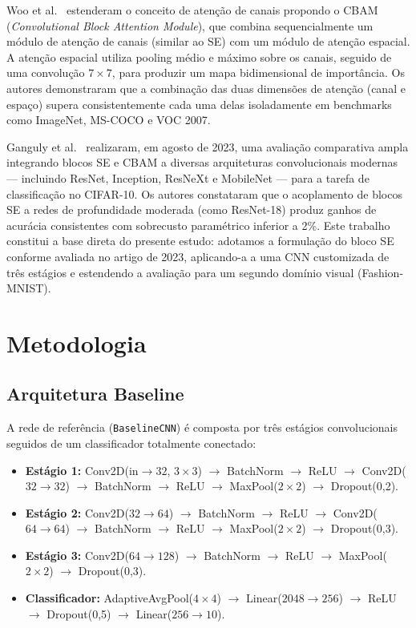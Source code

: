 \documentclass[runningheads]{llncs}
\begin{document}
Woo et al.~\cite{ref_cbam} estenderam o conceito de atenção de canais
propondo o CBAM (\textit{Convolutional Block Attention Module}), que
combina sequencialmente um módulo de atenção de canais (similar ao SE)
com um módulo de atenção espacial. A atenção espacial utiliza pooling
médio e máximo sobre os canais, seguido de uma convolução $7 \times 7$,
para produzir um mapa bidimensional de importância. Os autores
demonstraram que a combinação das duas dimensões de atenção (canal e
espaço) supera consistentemente cada uma delas isoladamente em
benchmarks como ImageNet, MS-COCO e VOC 2007.

Ganguly et al.~\cite{ref_ganguly2023} realizaram, em agosto de 2023, uma
avaliação comparativa ampla integrando blocos SE e CBAM a diversas
arquiteturas convolucionais modernas --- incluindo ResNet, Inception,
ResNeXt e MobileNet --- para a tarefa de classificação no CIFAR-10. Os
autores constataram que o acoplamento de blocos SE a redes de
profundidade moderada (como ResNet-18) produz ganhos de acurácia
consistentes com sobrecusto paramétrico inferior a 2\%. Este trabalho
constitui a base direta do presente estudo: adotamos a formulação do
bloco SE conforme avaliada no artigo de 2023, aplicando-a a uma CNN
customizada de três estágios e estendendo a avaliação para um segundo
domínio visual (Fashion-MNIST).

\section{Metodologia}

\subsection{Arquitetura Baseline}

A rede de referência (\texttt{BaselineCNN}) é composta por três estágios
convolucionais seguidos de um classificador totalmente conectado:

\begin{itemize}
  \item \textbf{Estágio 1:} Conv2D($\text{in} \to 32$, $3 \times 3$)
    $\to$ BatchNorm $\to$ ReLU $\to$ Conv2D($32 \to 32$) $\to$
    BatchNorm $\to$ ReLU $\to$ MaxPool($2 \times 2$) $\to$ Dropout(0,2).
  \item \textbf{Estágio 2:} Conv2D($32 \to 64$) $\to$ BatchNorm $\to$
    ReLU $\to$ Conv2D($64 \to 64$) $\to$ BatchNorm $\to$ ReLU $\to$
    MaxPool($2 \times 2$) $\to$ Dropout(0,3).
  \item \textbf{Estágio 3:} Conv2D($64 \to 128$) $\to$ BatchNorm $\to$
    ReLU $\to$ MaxPool($2 \times 2$) $\to$ Dropout(0,3).
  \item \textbf{Classificador:} AdaptiveAvgPool($4 \times 4$) $\to$
    Linear($2048 \to 256$) $\to$ ReLU $\to$ Dropout(0,5) $\to$
    Linear($256 \to 10$).
\end{itemize}
\end{document}

